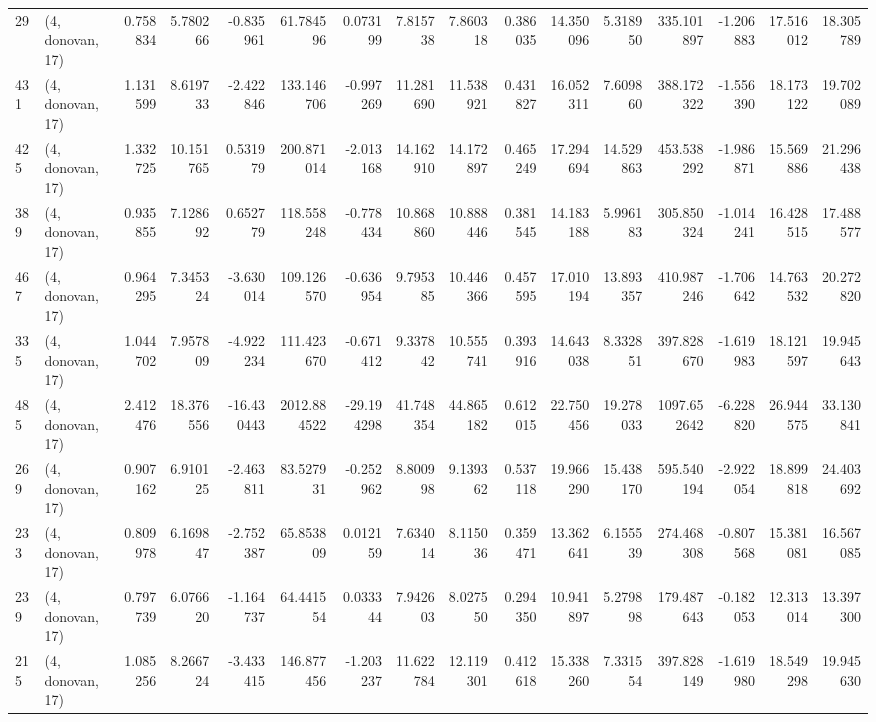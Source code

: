 \begin{tabular}{llrrrrrrrrrrrrrr}
29  &  (4, donovan, 17) &   0.758834 &   5.780266 &  -0.835961 &    61.784596 &   0.073199 &   7.815738 &   7.860318 &  0.386035 &  14.350096 &   5.318950 &   335.101897 & -1.206883 &  17.516012 &  18.305789 \\
431 &  (4, donovan, 17) &   1.131599 &   8.619733 &  -2.422846 &   133.146706 &  -0.997269 &  11.281690 &  11.538921 &  0.431827 &  16.052311 &   7.609860 &   388.172322 & -1.556390 &  18.173122 &  19.702089 \\
425 &  (4, donovan, 17) &   1.332725 &  10.151765 &   0.531979 &   200.871014 &  -2.013168 &  14.162910 &  14.172897 &  0.465249 &  17.294694 &  14.529863 &   453.538292 & -1.986871 &  15.569886 &  21.296438 \\
389 &  (4, donovan, 17) &   0.935855 &   7.128692 &   0.652779 &   118.558248 &  -0.778434 &  10.868860 &  10.888446 &  0.381545 &  14.183188 &   5.996183 &   305.850324 & -1.014241 &  16.428515 &  17.488577 \\
467 &  (4, donovan, 17) &   0.964295 &   7.345324 &  -3.630014 &   109.126570 &  -0.636954 &   9.795385 &  10.446366 &  0.457595 &  17.010194 &  13.893357 &   410.987246 & -1.706642 &  14.763532 &  20.272820 \\
335 &  (4, donovan, 17) &   1.044702 &   7.957809 &  -4.922234 &   111.423670 &  -0.671412 &   9.337842 &  10.555741 &  0.393916 &  14.643038 &   8.332851 &   397.828670 & -1.619983 &  18.121597 &  19.945643 \\
485 &  (4, donovan, 17) &   2.412476 &  18.376556 & -16.430443 &  2012.884522 & -29.194298 &  41.748354 &  44.865182 &  0.612015 &  22.750456 &  19.278033 &  1097.652642 & -6.228820 &  26.944575 &  33.130841 \\
269 &  (4, donovan, 17) &   0.907162 &   6.910125 &  -2.463811 &    83.527931 &  -0.252962 &   8.800998 &   9.139362 &  0.537118 &  19.966290 &  15.438170 &   595.540194 & -2.922054 &  18.899818 &  24.403692 \\
233 &  (4, donovan, 17) &   0.809978 &   6.169847 &  -2.752387 &    65.853809 &   0.012159 &   7.634014 &   8.115036 &  0.359471 &  13.362641 &   6.155539 &   274.468308 & -0.807568 &  15.381081 &  16.567085 \\
239 &  (4, donovan, 17) &   0.797739 &   6.076620 &  -1.164737 &    64.441554 &   0.033344 &   7.942603 &   8.027550 &  0.294350 &  10.941897 &   5.279898 &   179.487643 & -0.182053 &  12.313014 &  13.397300 \\
215 &  (4, donovan, 17) &   1.085256 &   8.266724 &  -3.433415 &   146.877456 &  -1.203237 &  11.622784 &  12.119301 &  0.412618 &  15.338260 &   7.331554 &   397.828149 & -1.619980 &  18.549298 &  19.945630 \\

\end{tabular}
